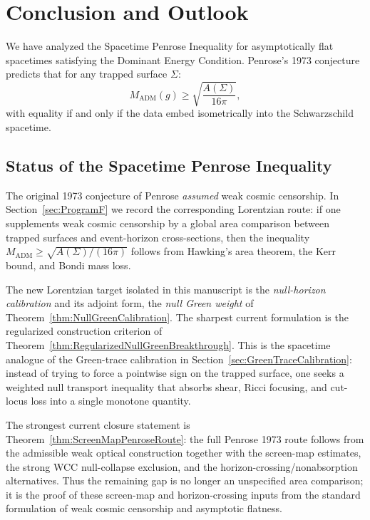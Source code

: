 \section{Conclusion and Outlook}
\label{sec:FinalConclusion}

We have analyzed the Spacetime Penrose Inequality for asymptotically flat spacetimes satisfying the Dominant Energy Condition. Penrose's 1973 conjecture predicts that for any trapped surface $\Sigma$:
\begin{equation*}
    M_{\mathrm{ADM}}(g) \ge \sqrt{\frac{A(\Sigma)}{16\pi}},
\end{equation*}
with equality if and only if the data embed isometrically into the Schwarzschild spacetime.

\subsection{Status of the Spacetime Penrose Inequality}

The original 1973 conjecture of Penrose \emph{assumed} weak cosmic censorship. In Section~\ref{sec:ProgramF} we record the corresponding Lorentzian route: if one supplements weak cosmic censorship by a global area comparison between trapped surfaces and event-horizon cross-sections, then the inequality $M_{\mathrm{ADM}} \geq \sqrt{A(\Sigma)/(16\pi)}$ follows from Hawking's area theorem, the Kerr bound, and Bondi mass loss.

The new Lorentzian target isolated in this manuscript is the \emph{null-horizon calibration} and its adjoint form, the \emph{null Green weight} of Theorem~\ref{thm:NullGreenCalibration}. The sharpest current formulation is the regularized construction criterion of Theorem~\ref{thm:RegularizedNullGreenBreakthrough}. This is the spacetime analogue of the Green-trace calibration in Section~\ref{sec:GreenTraceCalibration}: instead of trying to force a pointwise sign on the trapped surface, one seeks a weighted null transport inequality that absorbs shear, Ricci focusing, and cut-locus loss into a single monotone quantity.

The strongest current closure statement is Theorem~\ref{thm:ScreenMapPenroseRoute}: the full Penrose 1973 route follows from the admissible weak optical construction together with the screen-map estimates, the strong WCC null-collapse exclusion, and the horizon-crossing/nonabsorption alternatives. Thus the remaining gap is no longer an unspecified area comparison; it is the proof of these screen-map and horizon-crossing inputs from the standard formulation of weak cosmic censorship and asymptotic flatness.

